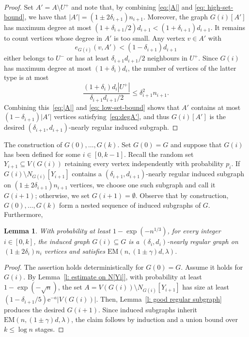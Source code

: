 \documentclass[reqno,a4paper]{amsart}
\makeatletter
\def\paragraph{\@startsection{paragraph}{4}%
  \z@{3pt}{-\fontdimen2\font}%
  {\normalfont\bfseries}}
\newtheorem{lemma}[theorem]{Lemma}
\theoremstyle{definition}
\newcommand{\e}{\mathrm{e}}
\newcommand{\EM}{\mathrm{EM}}
\makeatother
\begin{document}
\begin{proof}
Set $A'=A\setminus U^+$ and note that,
by combining \eqref{eq:|A|} and \eqref{eq: high-set-bound}, we have that $|A'|=(1\pm2\delta_{i+1})n_{i+1}$.
Moreover, the graph $G(i)[A']$ has maximum degree at most $(1+\delta_{i+1}/2)d_{i+1}<(1+\delta_{i+1})d_{i+1}$. It remains to count vertices whose degree in $A'$ is too small. Any vertex $v\in A'$ with
\begin{equation}\label{eq:degA'}
e_{G(i)}(v,A')<(1-\delta_{i+1})d_{i+1}    
\end{equation}
either belongs to $U^-$ or has at least $\delta_{i+1}d_{i+1}/2$ neighbours in $U^+$. Since $G(i)$ has maximum degree at most $(1+\delta_i)d_i$, the number of vertices of the latter type is at most
\[
    \frac{(1+\delta_i)d_i|U^+|}{\delta_{i+1}d_{i+1}/2}
    \le \delta_{i+1}^2n_{i+1}.
\]
Combining this~\eqref{eq:|A|} and \eqref{eq: low-set-bound} shows that $A'$ contains at most $(1-\delta_{i+1})|A'|$ vertices satisfying~\eqref{eq:degA'}, and thus $G(i)[A']$ is the desired $(\delta_{i+1},d_{i+1})$-nearly regular induced subgraph.
\end{proof}

\paragraph{The construction of $G(0),\ldots,G(k)$.}
Set $G(0)=G$ and suppose that $G(i)$ has been defined for some $i\in [0,k-1]$. 
Recall the random set $Y_{i+1}\subseteq V(G(i))$ retaining every vertex independently with probability $p_i$. 
If $G(i)\setminus N_{G(i)}[Y_{i+1}]$ contains a $(\delta_{i+1},d_{i+1})$-nearly regular induced subgraph on $(1\pm 2\delta_{i+1})n_{i+1}$ vertices, we choose one such subgraph and call it $G(i+1)$; otherwise, we set $G(i+1)=\emptyset$. Observe that by construction, $G(0),\ldots,G(k)$ form a nested sequence of induced subgraphs of $G$. Furthermore,

\begin{lemma}\label{l: validity}
With probability at least $1-\exp(-n^{1/3})$, for every integer $i\in [0,k]$, the induced graph $G(i)\subseteq G$ is a $(\delta_i,d_{i})$-nearly regular graph on $(1\pm2\delta_i)n_i$ vertices and satisfies $\EM(n,(1\pm \gamma)d,\lambda)$.
\end{lemma}

\begin{proof}
The assertion holds deterministically for $G(0)=G$. Assume it holds for $G(i)$. By Lemma~\ref{l: estimate on N[Yi]}, with probability at least $1-\exp(-\sqrt n)$, the set $A=V(G(i))\setminus N_{G(i)}[Y_{i+1}]$ has size at least $(1-\delta_{i+1}/5)\e^{-a}|V(G(i))|$. 
Then, Lemma~\ref{l: good regular subgraph} produces the desired $G(i+1)$. Since induced subgraphs inherit $\EM(n,(1\pm \gamma)d,\lambda)$, the claim follows by induction and a union bound over $k\le \log n$ stages.
\end{proof}
\end{document}
